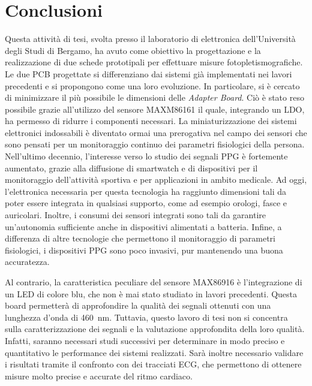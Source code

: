 \documentclass[
	a4paper,
	cleardoublepage=empty,
	headings=twolinechapter,
	numbers=autoenddot,
]{scrbook}
\begin{document}
	\chapter*{Conclusioni}
	Questa attività di tesi, svolta presso il laboratorio di elettronica dell'Università degli Studi di Bergamo, ha avuto come obiettivo la progettazione e la realizzazione di due schede prototipali per effettuare misure fotopletismografiche. Le due PCB progettate si differenziano dai sistemi già implementati nei lavori precedenti e si propongono come una loro evoluzione. In particolare, si è cercato di minimizzare il più possibile le dimensioni delle \textit{Adapter Board}. Ciò è stato reso possibile grazie all'utilizzo del sensore MAXM86161 il quale, integrando un LDO, ha permesso di ridurre i componenti necessari. La miniaturizzazione dei sistemi elettronici indossabili è diventato ormai una prerogativa nel campo dei sensori che sono pensati per un monitoraggio continuo dei parametri fisiologici della persona. Nell'ultimo decennio, l'interesse verso lo studio dei segnali PPG è fortemente aumentato, grazie alla diffusione di smartwatch e di dispositivi per il monitoraggio dell'attività sportiva e per applicazioni in ambito medicale. Ad oggi, l'elettronica necessaria per questa tecnologia ha raggiunto dimensioni tali da poter essere integrata in qualsiasi supporto, come ad esempio orologi, fasce e auricolari. Inoltre, i consumi dei sensori integrati sono tali da garantire un'autonomia sufficiente anche in dispositivi alimentati a batteria.	Infine, a differenza di altre tecnologie che permettono il monitoraggio di parametri fisiologici, i dispositivi PPG sono poco invasivi, pur mantenendo una buona accuratezza.
	
	Al contrario, la caratteristica peculiare del sensore MAX86916 è l'integrazione di un LED di colore blu, che non è mai stato studiato in lavori precedenti. Questa board permetterà di approfondire la qualità dei segnali ottenuti con una lunghezza d'onda di \SI{460}{\nano\meter}. Tuttavia, questo lavoro di tesi non si concentra sulla caratterizzazione dei segnali e la valutazione approfondita della loro qualità. Infatti, saranno necessari studi successivi per determinare in modo preciso e quantitativo le performance dei sistemi realizzati. Sarà inoltre necessario validare i risultati tramite il confronto con dei tracciati ECG, che permettono di ottenere misure molto precise e accurate del ritmo cardiaco.
	
\end{document}
